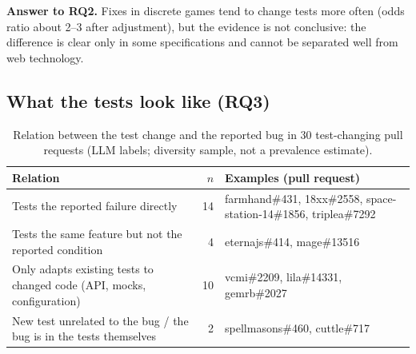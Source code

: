 \documentclass[10pt,twocolumn,a4paper]{article}
\newcommand{\para}[1]{\par\smallskip\noindent\textbf{#1}\enspace}
\begin{document}
\para{Answer to RQ2.}
Fixes in discrete games tend to change tests more often (odds ratio about 2--3 after adjustment), but the evidence is not conclusive: the difference is clear only in some specifications and cannot be separated well from web technology.

\subsection{What the tests look like (RQ3)}\label{sec:rq3}

\begin{table}[tb]
\centering
\caption{Relation between the test change and the reported bug in 30 test-changing pull requests (LLM labels; diversity sample, not a prevalence estimate).}\label{tab:relation}
\small
\begin{tabularx}{\textwidth}{@{}Lrl@{}}
\toprule
Relation & $n$ & Examples (pull request)\\
\midrule
Tests the reported failure directly & 14 & farmhand\#431, 18xx\#2558, space-station-14\#1856, triplea\#7292\\
Tests the same feature but not the reported condition & 4 & eternajs\#414, mage\#13516\\
Only adapts existing tests to changed code (API, mocks, configuration) & 10 & vcmi\#2209, lila\#14331, gemrb\#2027\\
New test unrelated to the bug / the bug is in the tests themselves & 2 & spellmasons\#460, cuttle\#717\\
\bottomrule
\end{tabularx}
\end{table}
\end{document}
